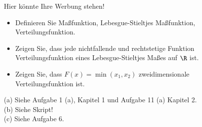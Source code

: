 \begin{exercise}

Hier könnte Ihre Werbung stehen!

\begin{itemize}
  \item[(a)] Definieren Sie Maßfunktion, Lebesgue-Stieltjes Maßfunktion, Verteilungsfunktion.
  \item[(b)] Zeigen Sie, dass jede nichtfallende und rechtstetige Funktion Verteilungsfunktion eines Lebesgue-Stieltjes Maßes auf $\R$ ist.
  \item[(c)] Zeigen Sie, dass $F(x) = \min(x_1, x_2)$ zweidimensionale Verteilungsfunktion ist.
\end{itemize}

\end{exercise}


\begin{solution}

(a) Siehe Aufgabe 1 (a), Kapitel 1 und Aufgabe 11 (a) Kapitel 2. \\

(b) Siehe Skript! \\

(c) Siehe Aufgabe 6.

\end{solution}
